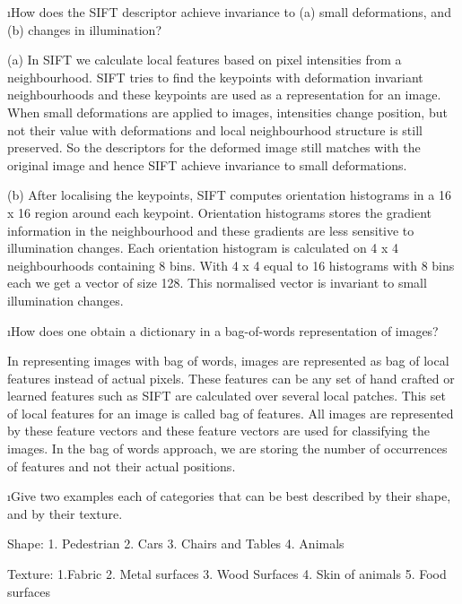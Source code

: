\documentclass[fleqn]{article}
\begin{document}




\bee
\i How does the SIFT descriptor achieve invariance to (a) small deformations, and (b) changes in illumination?
\begin{solution}
(a) In SIFT we calculate local features based on pixel intensities from a neighbourhood. SIFT tries to find the keypoints with deformation invariant neighbourhoods and these keypoints are used as a representation for an image. When small deformations are applied to images, intensities change position, but not their value with deformations and local neighbourhood structure is still preserved. So the descriptors for the deformed image still matches with the original image and hence SIFT achieve invariance to small deformations.

\vspace{1cm}
(b) After localising the keypoints, SIFT computes orientation histograms in a 16 x 16 region around each keypoint. Orientation histograms stores the gradient information in the neighbourhood and these gradients are less sensitive to illumination changes. Each orientation histogram is calculated on 4 x 4 neighbourhoods containing 8 bins. With  4 x 4 equal to 16 histograms with 8 bins each we get a vector of size 128. This normalised vector is invariant to small illumination changes.
\end{solution}

\vspace{1cm}


\i How does one obtain a dictionary in a bag-of-words representation of images?
\begin{solution}
In representing images with bag of words, images are represented as bag of local features instead of actual pixels. These features can be any set of hand crafted or learned features such as SIFT are calculated over several local patches. This set of local features for an image is called bag of features. All images are represented by these feature vectors and these feature vectors are used for classifying the images. In the bag of words approach, we are storing the number of occurrences of features and not their actual positions.    
\end{solution}

\vspace{2in}

\i Give two examples each of categories that can be best described by their shape, and by their texture.
\begin{solution}
Shape:
1. Pedestrian
2. Cars
3. Chairs and Tables
4. Animals

Texture:
1.Fabric
2. Metal surfaces
3. Wood Surfaces
4. Skin of animals
5. Food surfaces

\end{solution}
\ene
\end{document}
